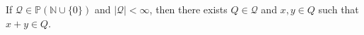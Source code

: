 If $\mathcal{Q} \in \mathbb{P}(\mathbb{N} \cup \{0\})$ and $|\mathcal{Q}| < \infty$, then there exists $Q \in \mathcal{Q}$ and $x, y \in Q$ such that $x + y \in Q$.
